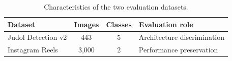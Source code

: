 \begin{table}[t]
\caption{Characteristics of the two evaluation datasets.}
\label{tab:datasets}
\centering
\footnotesize
\renewcommand{\arraystretch}{1.15}
\begin{tabular}{@{}lccl@{}}
\toprule
\textbf{Dataset} & \textbf{Images} & \textbf{Classes} & \textbf{Evaluation role} \\
\midrule
Judol Detection v2 & 443 & 5 & Architecture discrimination \\
Instagram Reels & 3{,}000 & 2 & Performance preservation \\
\bottomrule
\end{tabular}
\end{table}
